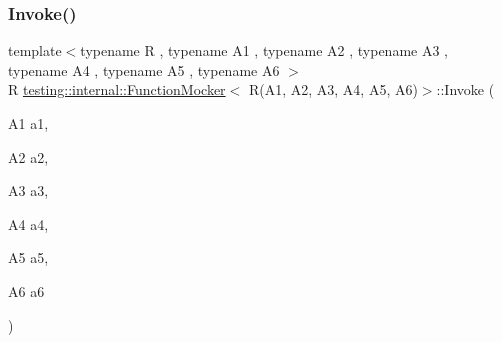 \subsubsection{\texorpdfstring{Invoke()}{Invoke()}}
{\footnotesize\ttfamily template$<$typename R , typename A1 , typename A2 , typename A3 , typename A4 , typename A5 , typename A6 $>$ \\
R \hyperlink{classtesting_1_1internal_1_1_function_mocker}{testing\+::internal\+::\+Function\+Mocker}$<$ R(A1, A2, A3, A4, A5, A6)$>$\+::Invoke (\begin{DoxyParamCaption}\item[{A1}]{a1,  }\item[{A2}]{a2,  }\item[{A3}]{a3,  }\item[{A4}]{a4,  }\item[{A5}]{a5,  }\item[{A6}]{a6 }\end{DoxyParamCaption})\hspace{0.3cm}{\ttfamily [inline]}}

\mbox{\label{classtesting_1_1internal_1_1_function_mocker_3_01_r_07_a1_00_01_a2_00_01_a3_00_01_a4_00_01_a5_00_01_a6_08_4_ab34f4d748a5a2fb68d6d27d963572c03}} 
